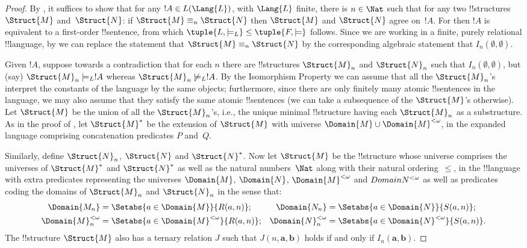 \documentclass[../../include/open-logic-section]{subfiles}
\begin{document}
\begin{proof}
By , it suffices to show that for any $!A
\in L(\Lang{L})$, with $\Lang{L}$ finite, there is $n \in \Nat$
such that for any two !!{structure}s $\Struct{M}$ and~$\Struct{N}$: if
$\Struct{M} \equiv_n \Struct{N}$ then $\Struct{M}$ and $\Struct{N}$
agree on~$!A$. For then $!A$ is equivalent to a first-order
!!{sentence}, from which $\tuple{L, \models_L} \le \tuple{F, \models}$
follows. Since we are working in a finite, purely relational
!!{language}, by  we can replace the statement
that $\Struct{M} \equiv_n \Struct{N}$ by the corresponding algebraic
statement that $I_n(\emptyset,\emptyset)$.

Given $!A$, suppose towards a contradiction that for each $n$
there are !!{structure}s $\Struct{M}_n$ and $\Struct{N}_n$ such that
$I_n(\emptyset, \emptyset)$, but (say) $\Struct{M}_n \models_L
!A$ whereas $\Struct{M}_n \not\models_L !A$. By the
Isomorphism Property we can assume that all the $\Struct{M}_n$'s
interpret the constants of the language by the same objects;
furthermore, since there are only finitely many atomic !!{sentence}s in
the language, we may also assume that they satisfy the same atomic
!!{sentence}s (we can take a subsequence of the $\Struct{M}$'s
otherwise). Let $\Struct{M}$ be the union of all the $\Struct{M}_n$'s,
i.e., the unique minimal !!{structure} having each $\Struct{M}_n$ as a
substructure.  As in the proof of , let
$\Struct{M}^*$ be the extension of $\Struct{M}$ with universe $\Domain{M} \cup
\Domain{M}^{<\omega}$, in the expanded language comprising concatenation
predicates $P$ and~$Q$.

Similarly, define $\Struct{N}_n$, $\Struct{N}$ and $\Struct{N}^*$. Now
let $\Struct{M}$ be the !!{structure} whose universe comprises the
universes of $\Struct{M}^*$ and $\Struct{N}^*$ as well as the natural
numbers~$\Nat$ along with their natural ordering~$\le$, in the
!!{language} with extra predicates representing the universes
$\Domain{M}$, $\Domain{N}$, $\Domain{M}^{<\omega}$ and
$\\Domain{N}^{<\omega}$ as well as predicates coding the domains of
$\Struct{M}_n$ and $\Struct{N}_n$ in the sense that:
\begin{align*}
  \Domain{M_n} & = \Setabs{a \in \Domain{M}}{R(a, n)}; & 
  \Domain{N_n} & = \Setabs{a \in \Domain{N}}{S(a,n)}; \\
  \Domain{M}^{<\omega}_n & = \Setabs{a \in \Domain{M}^{<\omega}}{R(a,n)}; &
  \Domain{N}^{<\omega}_n & = \Setabs{a \in \Domain{N}^{<\omega}}{S(a,n)}. 
\end{align*}
The !!{structure} $\Struct{M}$ also has a ternary relation $J$ such
that $J(n, \mathbf{a}, \mathbf{b})$ holds if and only if
$I_n(\mathbf{a}, \mathbf{b})$.


\end{proof}
\end{document}

